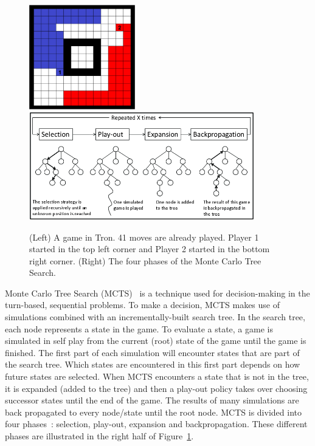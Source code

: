 \documentclass{article}
\begin{document}
\begin{figure}[h]
\begin{center}
\includegraphics[width=4.6cm]{images/tron_field.png} \hspace{0.4cm} \includegraphics[width=9.8cm]{images/mcts_figure.png}
\caption{(Left) A game in Tron. 41 moves are already played. Player 1 started in the top left corner and Player 2 started in the bottom right corner.
 (Right) The four phases of the Monte Carlo Tree Search. \label{fig:tron-mcts}}
\end{center}
\end{figure}


Monte Carlo Tree Search (MCTS)~\cite{coulom, kocsis} is a technique used for decision-making in the turn-based, sequential problems. 
To make a decision, MCTS makes use of simulations combined with an incrementally-built search tree. 
In the search tree, each node represents a state in the game. To evaluate a state, a game is simulated in self play from the current (root) state of the game until the game is finished. The first part of each simulation will encounter states that are part of the search tree. Which states are encountered in this first part depends on how future states are selected. When MCTS encounters a state that is not in the tree, it is expanded (added to the tree) and then a play-out policy takes over choosing successor states until the end of the game. 
The results of many simulations are back propagated to every node/state until the root node.
MCTS is divided into four phases~\cite{ChaslotWHUB2008}: selection, play-out, expansion and backpropagation. 
These different phases are illustrated in the right half of Figure~\ref{fig:tron-mcts}.
\end{document}
